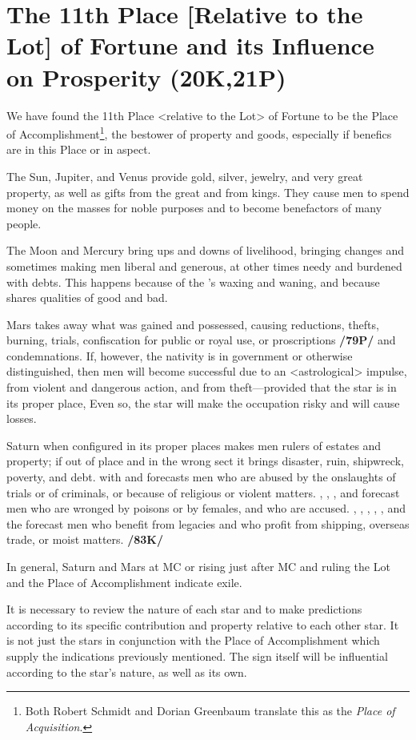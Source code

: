 \section{The 11th Place [Relative to the Lot] of Fortune and its Influence on Prosperity (20K,21P)}
We have found the 11th Place <relative to the Lot> of Fortune to be the Place of Accomplishment\footnote{Both Robert Schmidt and Dorian Greenbaum translate this as the \textsl{Place of Acquisition}.}, the bestower of property and goods, especially if benefics are in this Place or in aspect. 

  
The Sun, Jupiter, and Venus provide gold, silver, jewelry, and very great property, as well as gifts from the great and from kings. They cause men to spend money on the masses for noble purposes and to become benefactors of many
people. 

 
The Moon and Mercury bring ups and downs of livelihood, bringing changes and sometimes making men liberal and generous, at other times needy and burdened with debts. This happens because of the \Moon’s waxing and waning, and because \Mercury\xspace shares qualities of good and bad. 

Mars takes away what was gained and possessed, causing reductions, thefts, burning, trials, confiscation for public or royal use, or proscriptions \textbf{/79P/} and condemnations. If, however, the nativity is in government or otherwise distinguished, then men will become successful due to an <astrological> impulse, from violent and dangerous action, and from theft—provided that the star is in its proper place, Even so, the star will make the occupation risky and will cause losses. 

Saturn when configured in its proper places makes men rulers of estates and property; if out of place and in the wrong sect it brings disaster, ruin, shipwreck, poverty, and
debt. \Saturn\xspace with \Mercury\xspace and \Mars\xspace forecasts men who are abused by the onslaughts of trials or of criminals, or because of religious or violent matters. \Saturn, \Mercury, \Mars, and \Venus forecast men who are wronged by poisons or by females, and who are accused. \Saturn, \Mars, \Mercury, \Venus, \Jupiter, and the \Moon\xspace forecast men who benefit from legacies and who profit from shipping, overseas trade, or moist matters. \textbf{/83K/}

 
In general, Saturn and Mars at MC or rising just after MC and ruling the Lot and the Place of Accomplishment indicate exile.

\mndl [0.2cm]
It is necessary to review the nature of each star and to make predictions according to its specific contribution and property relative to each other star. It is not just the stars in conjunction with the Place of Accomplishment which supply the indications previously mentioned. The sign itself will be influential according to the star’s nature, as well as its own.

\newpage
